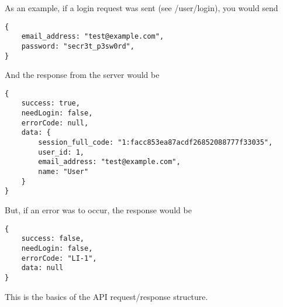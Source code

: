 \documentclass{article}[11pt]
\begin{document}
As an example, if a login request was sent (see /user/login), you would send

\begin{verbatim}
{
    email_address: "test@example.com",
    password: "secr3t_p3sw0rd",
}
\end{verbatim}

And the response from the server would be
\begin{verbatim}
{
    success: true,
    needLogin: false,
    errorCode: null,
    data: {
    	session_full_code: "1:facc853ea87acdf26852088777f33035",
    	user_id: 1,
    	email_address: "test@example.com",
    	name: "User"
    }
}
\end{verbatim}

But, if an error was to occur, the response would be
\begin{verbatim}
{
    success: false,
    needLogin: false,
    errorCode: "LI-1",
    data: null
}
\end{verbatim}

This is the basics of the API request/response structure.

\newpage


\newcommand{\ErrorsBasic}{

\noindent
\textbf{Error Codes:} \\
W-0: Failure - Empty or null request body \\
}

\newcommand{\ErrorsMysql}{
\ErrorsBasic
W-1: Exception - An unknown error occurred in connecting to the database.  \\
W-2: Exception - An unknown error occurred in the server.  \\
}

\newcommand{\ErrorsSession}{
\ErrorsMysql
W-3: Failure - session\_full\_code was empty or null.  \\
W-4: Failure - session\_full\_code was invalid. Make sure its a valid session code received from /user/login.  \\
W-5: Exception - An unknown error occurred in the server.  \\
W-6: Exception - An unknown error occurred in finding the session.  \\
}
\end{document}
